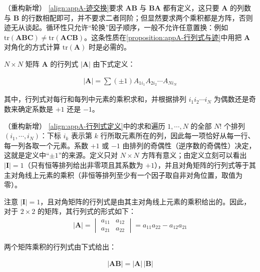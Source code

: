\documentclass[../main.tex]{subfiles}
\begin{document}
\begin{remark}（重构新增）
\eqref{align:appA-迹交换}要求 $\bm{A}\bm{B}$ 与 $\bm{B}\bm{A}$ 都有定义，这只要 $\bm{A}$ 的列数与 $\bm{B}$ 的行数相配即可，并不要求二者同阶；但显然要求两个乘积都是方阵，否则迹无从谈起。循环性只允许“轮换”因子顺序，一般不允许任意置换：例如 $\mathrm{tr}(\bm{A}\bm{B}\bm{C})\neq\mathrm{tr}(\bm{A}\bm{C}\bm{B})$。这条性质在\cref{proposition:appA-行列式与迹}中用把 $\bm{A}$ 对角化的方式计算 $\mathrm{tr}(\bm{A})$ 时是必需的。
\end{remark}

$N\times N$ 矩阵 $\bm{A}$ 的行列式 $|\bm{A}|$ 由下式定义：
\begin{definition}[行列式]\label{definition:appA-行列式}
\begin{align}
  |\bm{A}|=\sum(\pm1)A_{1i_1}A_{2i_2}\cdots A_{Ni_N}
  \label{align:appA-行列式定义}
\end{align}
\end{definition}

其中，行列式对每行和每列中元素的乘积求和，并根据排列 $i_1i_2\cdots i_N$ 为偶数还是奇数来确定系数是 $+1$ 还是 $-1$。

\begin{remark}（重构新增）
\eqref{align:appA-行列式定义}中的求和遍历 $1,\cdots,N$ 的全部 $N!$ 个排列 $(i_1,\cdots,i_N)$：下标 $i_k$ 表示第 $k$ 行所取元素所在的列，因此每一项恰好从每一行、每一列各取一个元素。系数 $+1$ 或 $-1$ 由排列的奇偶性（逆序数的奇偶性）决定，这就是定义中“$\pm1$”的来源。定义只对 $N\times N$ 方阵有意义；由定义立刻可以看出 $|\bm{I}|=1$（只有恒等排列给出非零项且其系数为 $+1$），并且对角矩阵的行列式等于其主对角线上元素的乘积（非恒等排列至少有一个因子取自非对角位置，取值为零）。
\end{remark}

注意 $|\bm{I}|=1$，且对角矩阵的行列式是由其主对角线上元素的乘积给出的。因此，对于 $2\times2$ 的矩阵，其行列式的形式如下：
\begin{align}
  |\bm{A}|=\begin{vmatrix}a_{11}&a_{12}\\a_{21}&a_{22}\end{vmatrix}=a_{11}a_{22}-a_{12}a_{21}
  \label{align:appA-二阶行列式}
\end{align}

两个矩阵乘积的行列式由下式给出：
\begin{proposition}[乘积的行列式]\label{proposition:appA-乘积的行列式}
\begin{align}
  |\bm{A}\bm{B}|=|\bm{A}|\,|\bm{B}|
  \label{align:appA-行列式乘积}
\end{align}
\end{proposition}
\end{document}
